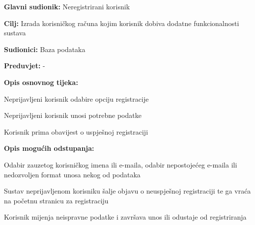						
						\noindent {}
					\begin{packed_item}
	
						\item \textbf{Glavni sudionik: }Neregistrirani korisnik
						\item  \textbf{Cilj:} Izrada korisničkog računa kojim korisnik dobiva dodatne funkcionalnosti sustava
						\item  \textbf{Sudionici:} Baza podataka
						\item  \textbf{Preduvjet:} -
						\item  \textbf{Opis osnovnog tijeka:}
						
						\item[] \begin{packed_enum}
	
							\item Neprijavljeni korisnik odabire opciju registracije
							\item Neprijavljeni korisnik unosi potrebne podatke
							\item Korisnik prima obavijest o uspješnoj registraciji
						\end{packed_enum}
					
						\item  \textbf{Opis mogućih odstupanja:}
						
						\item[] \begin{packed_item}
	
							\item[-]
							Odabir zauzetog korisničkog imena ili e-maila, odabir nepostojećeg e-maila ili nedozvoljen format unosa nekog od podataka
							\item[] \begin{packed_enum}
								
								\item Sustav neprijavljenom korisniku šalje objavu o neuspješnoj registraciji te ga vraća na početnu stranicu za registraciju
								\item Korisnik mijenja neispravne podatke i završava unos ili odustaje od registriranja
								
							\end{packed_enum}
						\end{packed_item}
					\end{packed_item}
					
